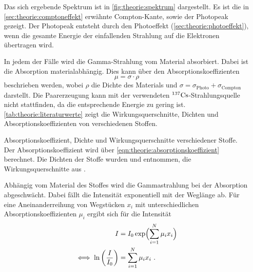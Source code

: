     Das sich ergebende Spektrum ist in \autoref{fig:theorie:spektrum} dargestellt.
    Es ist die in \autoref{sec:theorie:comptoneffekt} erwähnte Compton-Kante,
    sowie der Photopeak gezeigt.
    Der Photopeak entsteht durch den Photoeffekt (\autoref{sec:theorie:photoeffekt}),
    wenn die gesamte Energie der einfallenden Strahlung auf die Elektronen übertragen wird.

    In jedem der Fälle wird die Gamma-Strahlung vom Material absorbiert.
    Dabei ist die Absorption materialabhängig.
    Dies kann über den Absorptionskoeffizienten
    \begin{equation}
        \mu = \sigma \cdot \rho
        \label{eqn:theorie:absorptionskoeffizient}
    \end{equation}
    beschrieben werden,
    wobei $\rho$ die Dichte des Materials und $\sigma = \sigma_\text{Photo} + \sigma_\text{Compton}$ darstellt.
    Die Paarerzeugung kann mit der verwendeten $^{137}\ce{Cs}$-Strahlungsquelle nicht stattfinden,
    da die entsprechende Energie zu gering ist.
    \autoref{tab:theorie:literaturwerte} zeigt die Wirkungsquerschnitte,
    Dichten und Absorptionskoeffizienten von verschiedenen Stoffen.
    \begin{table}[H]
        \centering
        \caption{Absorptionskoeffizient, Dichte und Wirkungsquerschnitte verschiedener Stoffe.
        Der Absorptionskoeffizient wird über \autoref{eqn:theorie:absorptionskoeffizient} berechnet.
        Die Dichten der Stoffe wurden \cite{dichten} und \cite{dichte_delrin} entnommen,
        die Wirkungsquerschnitte aus \cite{crosssections}.}
        \label{tab:theorie:literaturwerte}
    \end{table}
    Abhängig vom Material des Stoffes wird die Gammastrahlung bei der Absorption abgeschwächt.
    Dabei fällt die Intensität exponentiell mit der Weglänge ab.
    Für eine Aneinanderreihung von Wegstücken $x_i$
    mit unterschiedlichen Absorptionskoeffizienten $\mu_i$
    ergibt sich für die Intensität
    \begin{align}
        I &= I_0 \exp\Bigl(\sum_{i=1}^N \mu_i x_i \Bigr) \\
        \iff \ln\left(\frac{I}{I_0}\right) &= \sum_{i=1}^N \mu_i x_i \ .
        \label{eqn:theorie:intensitaet2}
    \end{align}
